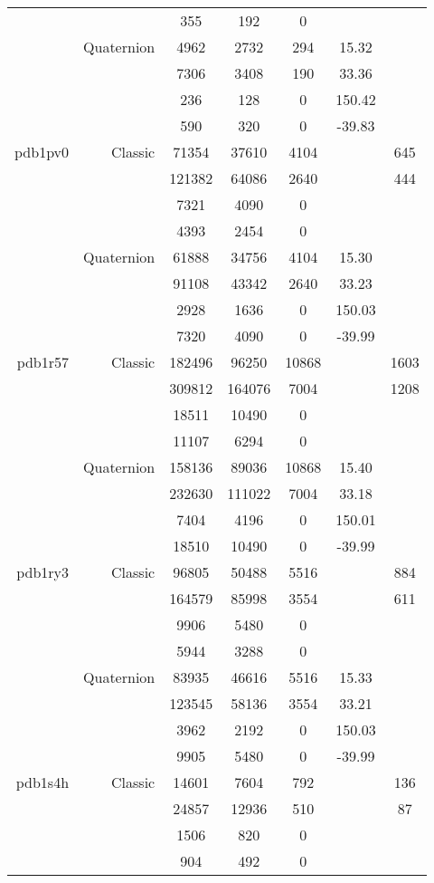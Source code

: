 \begin{xltabular}{\textwidth}{r|rcccSc}
& & 355 & 192 & 0 & & \\
& Quaternion & 4962 & 2732 & 294 & 15.32 & \\
& & 7306 & 3408 & 190 & 33.36 & \\
& & 236 & 128 & 0 & 150.42 & \\
& & 590 & 320 & 0 & -39.83 & \\ \addlinespace
pdb1pv0 & Classic & 71354 & 37610 & 4104 & & 645 \\
& & 121382 & 64086 & 2640 & & 444 \\
& & 7321 & 4090 & 0 & & \\
& & 4393 & 2454 & 0 & & \\
& Quaternion & 61888 & 34756 & 4104 & 15.30 & \\
& & 91108 & 43342 & 2640 & 33.23 & \\
& & 2928 & 1636 & 0 & 150.03 & \\
& & 7320 & 4090 & 0 & -39.99 & \\ \addlinespace
pdb1r57 & Classic & 182496 & 96250 & 10868 & & 1603 \\
& & 309812 & 164076 & 7004 & & 1208 \\
& & 18511 & 10490 & 0 & & \\
& & 11107 & 6294 & 0 & & \\
& Quaternion & 158136 & 89036 & 10868 & 15.40 & \\
& & 232630 & 111022 & 7004 & 33.18 & \\
& & 7404 & 4196 & 0 & 150.01 & \\
& & 18510 & 10490 & 0 & -39.99 & \\ \addlinespace
pdb1ry3 & Classic & 96805 & 50488 & 5516 & & 884 \\
& & 164579 & 85998 & 3554 & & 611 \\
& & 9906 & 5480 & 0 & & \\
& & 5944 & 3288 & 0 & & \\
& Quaternion & 83935 & 46616 & 5516 & 15.33 & \\
& & 123545 & 58136 & 3554 & 33.21 & \\
& & 3962 & 2192 & 0 & 150.03 & \\
& & 9905 & 5480 & 0 & -39.99 & \\ \addlinespace
pdb1s4h & Classic & 14601 & 7604 & 792 & & 136 \\
& & 24857 & 12936 & 510 & & 87 \\
& & 1506 & 820 & 0 & & \\
& & 904 & 492 & 0 & & \\

\end{xltabular}
